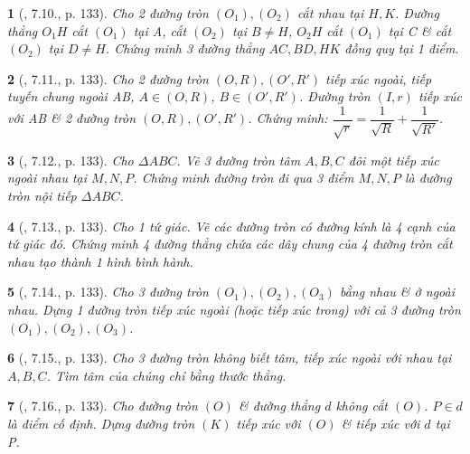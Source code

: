 \documentclass{article}
\newtheorem{baitoan}{}
\begin{document}
\begin{baitoan}[\cite{Binh_boi_duong_Toan_9_tap_1}, 7.10., p. 133]
	 Cho 2 đường tròn $(O_1),(O_2)$ cắt nhau tại $H,K$. Đường thẳng $O_1H$ cắt $(O_1)$ tại A, cắt $(O_2)$ tại $B\ne H$, $O_2H$ cắt $(O_1)$ tại C \& cắt $(O_2)$ tại $D\ne H$. Chứng minh 3 đường thẳng $AC,BD,HK$ đồng quy tại 1 điểm.
\end{baitoan}

\begin{baitoan}[\cite{Binh_boi_duong_Toan_9_tap_1}, 7.11., p. 133]
	Cho 2 đường tròn $(O,R),(O',R')$ tiếp xúc ngoài, tiếp tuyến chung ngoài AB, $A\in(O,R)$, $B\in(O',R')$. Đường tròn $(I,r)$ tiếp xúc với AB \& 2 đường tròn $(O,R),(O',R')$. Chứng minh: $\dfrac{1}{\sqrt{r}} = \dfrac{1}{\sqrt{R}} + \dfrac{1}{\sqrt{R'}}$.
\end{baitoan}

\begin{baitoan}[\cite{Binh_boi_duong_Toan_9_tap_1}, 7.12., p. 133]
	Cho $\Delta ABC$. Vẽ 3 đường tròn tâm $A,B,C$ đôi một tiếp xúc ngoài nhau tại $M,N,P$. Chứng minh đường tròn đi qua 3 điểm $M,N,P$ là đường tròn nội tiếp $\Delta ABC$.
\end{baitoan}

\begin{baitoan}[\cite{Binh_boi_duong_Toan_9_tap_1}, 7.13., p. 133]
	Cho 1 tứ giác. Vẽ các đường tròn có đường kính là 4 cạnh của tứ giác đó. Chứng minh 4 đường thẳng chứa các dây chung của 4 đường tròn cắt nhau tạo thành 1 hình bình hành.
\end{baitoan}

\begin{baitoan}[\cite{Binh_boi_duong_Toan_9_tap_1}, 7.14., p. 133]
	Cho 3 đường tròn $(O_1),(O_2),(O_3)$ bằng nhau \& ở ngoài nhau. Dựng 1 đường tròn tiếp xúc ngoài (hoặc tiếp xúc trong) với cả 3 đường tròn $(O_1),(O_2),(O_3)$.
\end{baitoan}

\begin{baitoan}[\cite{Binh_boi_duong_Toan_9_tap_1}, 7.15., p. 133]
	Cho 3 đường tròn không biết tâm, tiếp xúc ngoài với nhau tại $A,B,C$. Tìm tâm của chúng chỉ bằng thước thẳng.
\end{baitoan}

\begin{baitoan}[\cite{Binh_boi_duong_Toan_9_tap_1}, 7.16., p. 133]
	Cho đường tròn $(O)$ \& đường thẳng $d$ không cắt $(O)$. $P\in d$ là điểm cố định. Dựng đường tròn $(K)$ tiếp xúc với $(O)$ \& tiếp xúc với $d$ tại P.
\end{baitoan}
\end{document}
